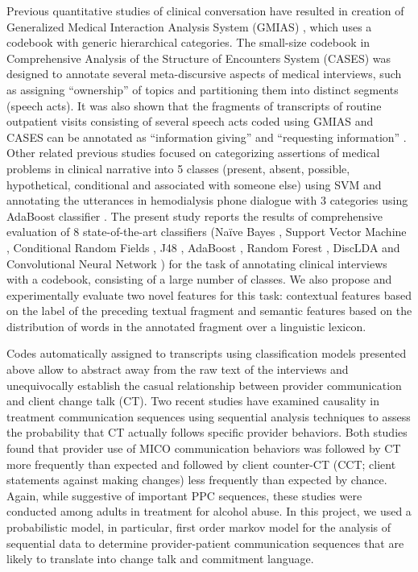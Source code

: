 \documentclass{amia}
\begin{document}
Previous quantitative studies of clinical conversation have resulted in creation of Generalized Medical Interaction Analysis System (GMIAS) \citep{10}, which uses a codebook with generic hierarchical categories. The small-size codebook in Comprehensive Analysis of the Structure of Encounters System (CASES) \citep{11} was designed to annotate several
meta-discursive aspects of medical interviews, such as assigning ``ownership'' of topics and partitioning them into distinct segments (speech acts). It was also shown that the
fragments of transcripts of routine outpatient visits consisting of several speech acts coded using GMIAS and CASES can be annotated as ``information giving'' and ``requesting
information'' \citep{12}. Other related previous studies focused on categorizing assertions of medical problems in clinical narrative into 5 classes (present, absent, possible,
hypothetical, conditional and associated with someone else) using SVM \citep{13} and annotating the utterances in hemodialysis phone dialogue with 3 categories using AdaBoost
classifier \citep{14}. The present study reports the results of comprehensive evaluation of 8 state-of-the-art classifiers (Na\"{i}ve Bayes \citep{15,16,17}, Support Vector Machine
\citep{18,19}, Conditional Random Fields \citep{21,22}, J48 \citep{23}, AdaBoost \citep{24}, Random Forest \citep{42}, DiscLDA \citep{25} and Convolutional Neural Network
\citep{38}) for the task of annotating clinical interviews with a codebook, consisting of a large number of classes. We also propose and experimentally evaluate two novel features
for this task: contextual features based on the label of the preceding textual fragment and semantic features based on the distribution of words in the annotated fragment over a linguistic lexicon.

Codes automatically assigned to transcripts using classification models presented above allow to abstract away from the raw text  of the interviews and unequivocally establish the casual relationship between provider communication and client change talk (CT). Two recent studies \citep{46,47} have examined causality in treatment communication sequences using sequential analysis techniques to assess the probability that CT actually follows specific provider behaviors. Both studies found that provider use of MICO communication behaviors was followed by CT more frequently than expected and followed by client counter-CT (CCT; client statements against making changes) less frequently than expected by chance. Again, while suggestive of important PPC sequences, these studies were conducted among adults in treatment for alcohol abuse. In this project, we used a probabilistic model, in particular, first order markov model for the analysis of sequential data to determine provider-patient communication sequences that are likely to translate into change talk and commitment language.
\end{document}
